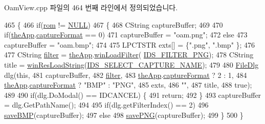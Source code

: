 Oam\+View.\+cpp 파일의 464 번째 라인에서 정의되었습니다.


\begin{DoxyCode}
465 \{
466   \textcolor{keywordflow}{if}(\mbox{\hyperlink{_globals_8cpp_adafc6ed627110c42f3893c9783f55320}{rom}} != \mbox{\hyperlink{getopt1_8c_a070d2ce7b6bb7e5c05602aa8c308d0c4}{NULL}})
467   \{
468     CString captureBuffer;
469 
470     \textcolor{keywordflow}{if}(\mbox{\hyperlink{_v_b_a_8cpp_a8095a9d06b37a7efe3723f3218ad8fb3}{theApp}}.\mbox{\hyperlink{class_v_b_a_a103f0b25433c57c4458a208a06799cf8}{captureFormat}} == 0)
471       captureBuffer = \textcolor{stringliteral}{"oam.png"};
472     \textcolor{keywordflow}{else}
473       captureBuffer = \textcolor{stringliteral}{"oam.bmp"};
474 
475     LPCTSTR exts[] = \{\textcolor{stringliteral}{".png"}, \textcolor{stringliteral}{".bmp"} \};
476 
477     CString \mbox{\hyperlink{_s_d_l_8cpp_af0122ee4312107103b580a98c74a4ea6}{filter}} = \mbox{\hyperlink{_v_b_a_8cpp_a8095a9d06b37a7efe3723f3218ad8fb3}{theApp}}.\mbox{\hyperlink{class_v_b_a_a228edf26b0dc4129658c174ee5a3c27c}{winLoadFilter}}(
      \mbox{\hyperlink{resource_8h_a374944c3928d8197bc2bbf9e85207a4d}{IDS\_FILTER\_PNG}});
478     CString title = \mbox{\hyperlink{_win_res_util_8cpp_a416e85e80ab9b01376e87251c83d1a5a}{winResLoadString}}(\mbox{\hyperlink{resource_8h_a10c24c77703afe57f6e641e939997cd2}{IDS\_SELECT\_CAPTURE\_NAME}});
479 
480     \mbox{\hyperlink{class_file_dlg}{FileDlg}} dlg(\textcolor{keyword}{this},
481                 captureBuffer,
482                 \mbox{\hyperlink{_s_d_l_8cpp_af0122ee4312107103b580a98c74a4ea6}{filter}},
483                 \mbox{\hyperlink{_v_b_a_8cpp_a8095a9d06b37a7efe3723f3218ad8fb3}{theApp}}.\mbox{\hyperlink{class_v_b_a_a103f0b25433c57c4458a208a06799cf8}{captureFormat}} ? 2 : 1,
484                 \mbox{\hyperlink{_v_b_a_8cpp_a8095a9d06b37a7efe3723f3218ad8fb3}{theApp}}.\mbox{\hyperlink{class_v_b_a_a103f0b25433c57c4458a208a06799cf8}{captureFormat}} ? \textcolor{stringliteral}{"BMP"} : \textcolor{stringliteral}{"PNG"},
485                 exts,
486                 \textcolor{stringliteral}{""},
487                 title,
488                 \textcolor{keyword}{true});
489 
490     \textcolor{keywordflow}{if}(dlg.DoModal() == IDCANCEL) \{
491       \textcolor{keywordflow}{return};
492     \}
493     captureBuffer = dlg.GetPathName();
494 
495     \textcolor{keywordflow}{if}(dlg.getFilterIndex() == 2)
496       \mbox{\hyperlink{class_oam_view_aa760ae67c006a164258c21a127e1e847}{saveBMP}}(captureBuffer);
497     \textcolor{keywordflow}{else}
498       \mbox{\hyperlink{class_oam_view_ac5531c409060efd6ef1654ae908db4ef}{savePNG}}(captureBuffer); 
499   \}
500 \}
\end{DoxyCode}
